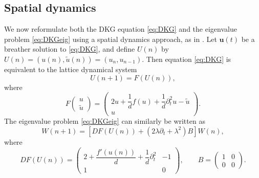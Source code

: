 \documentclass[12pt,reqno]{amsart}
\newcommand{\uvec}{\mathbf{u}}
\begin{document}
\subsection{Spatial dynamics}

We now reformulate both the DKG equation \cref{eq:DKG} and the eigenvalue problem \cref{eq:DKGeig} using a spatial dynamics approach, as in \cites{Parker2020,Parker2021}. Let $\uvec(t)$ be a breather solution to \cref{eq:DKG}, and define $U(n)$ by $U(n) = (u(n), \tilde{u}(n)) = ( u_n, u_{n-1} )$. Then equation \cref{eq:DKG} is equivalent to the lattice dynamical system
\begin{equation}\label{eq:dynEq}
U(n+1) = F(U(n)),
\end{equation}
where
\begin{equation}\label{eq:F}
F\begin{pmatrix}u \\ \tilde{u} \end{pmatrix} = 
\begin{pmatrix}2u  + \dfrac{1}{d}f(u) + \dfrac{1}{d} \partial_t^2 u - \tilde{u} \\
u
\end{pmatrix}.
\end{equation}
The eigenvalue problem \cref{eq:DKGeig} can similarly be written as 
\begin{equation}\label{eq:dynEVP}
W(n+1) = \left[ DF(U(n)) + (2 \lambda \partial_t + \lambda^2) B \right] W(n),
\end{equation}
where
\begin{equation}\label{eq:DF0}
DF(U(n)) = \begin{pmatrix}
2 + \dfrac{f'(u(n))}{d} + \dfrac{1}{d}\partial_t^2  & -1 \\ 1 & 0
\end{pmatrix}, \qquad
B = \begin{pmatrix} 1 & 0 \\ 0 & 0 \end{pmatrix}.
\end{equation}
\end{document}
